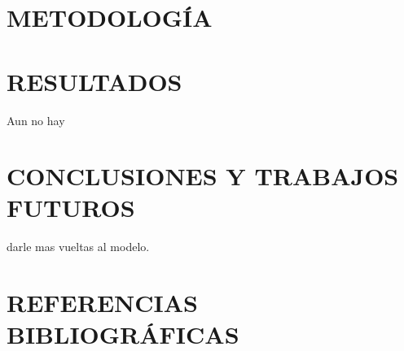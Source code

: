 \documentclass[12pt,a4paper]{article}
\begin{document}
\section{METODOLOGÍA}
             

\section{RESULTADOS}
	Aun no hay

\section{CONCLUSIONES Y TRABAJOS FUTUROS}
	 darle mas vueltas al modelo.
\section{REFERENCIAS BIBLIOGRÁFICAS}

\printbibliography


\newpage


\end{document}
